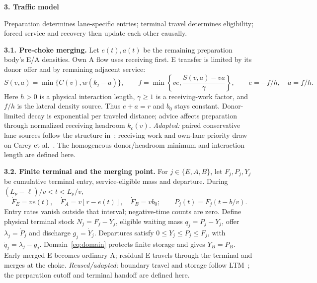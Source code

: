 \documentclass[10pt,a4paper]{article}
\newcommand{\head}[1]{\par\vspace{4pt}\noindent\textbf{#1}\par\nobreak\vspace{1pt}}
\begin{document}
\head{3. Traffic model}
Preparation determines lane-specific entries; terminal travel determines
eligibility; forced service and recovery then update each other causally.

\textbf{3.1. Pre-choke merging.}
Let $e(t),a(t)$ be the remaining preparation body's E/A densities.
Own A flow uses receiving first. E transfer is limited by its donor offer
and by remaining adjacent service:
\begin{equation}
 S(v,a)=\min\{C(v),w(k_j-a)\},\qquad
 f=\min\!\left\{ve,\frac{S(v,a)-va}{\gamma}\right\},\qquad
 \dot e=-f/h,\quad \dot a=f/h.
 \label{eq:prep}
\end{equation}
Here $h>0$ is a physical interaction length, $\gamma\geq1$ is a receiving-work
factor, and $f/h$ is the lateral density source. Thus $e+a=r$ and $b_0$
stays constant. Donor-limited decay is exponential per traveled distance;
advice affects preparation through normalized receiving headroom $k_c(v)$.
\emph{Adapted:} paired conservative lane sources follow the structure
in~\cite{subraveti}; receiving work and own-lane priority draw on
Carey et al.~\cite{carey}. The homogeneous donor/headroom minimum and
interaction length are defined here.

\textbf{3.2. Finite terminal and the merging point.}
For $j\in\{E,A,B\}$, let $F_j,P_j,Y_j$ be cumulative terminal entry,
service-eligible mass and departure. During
$(L_p-\ell)/v<t<L_p/v$,
\begin{equation}
 \dot F_E=ve(t),\quad \dot F_A=v[r-e(t)],\quad \dot F_B=vb_0;
 \qquad P_j(t)=F_j(t-b/v).
 \label{eq:arrivals}
\end{equation}
Entry rates vanish outside that interval; negative-time counts are zero.
Define physical terminal stock $N_j=F_j-Y_j$, eligible waiting mass
$q_j=P_j-Y_j$, offer $\lambda_j=\dot P_j$ and discharge $g_j=\dot Y_j$.
Departures satisfy $0\leq Y_j\leq P_j\leq F_j$, with
$\dot q_j=\lambda_j-g_j$. Domain~\eqref{eq:domain} protects finite storage
and gives $Y_B=P_B$. Early-merged E becomes ordinary A; residual E travels
through the terminal and merges at the choke.
\emph{Reused/adapted:} boundary travel and storage follow LTM~\cite{jin};
the preparation cutoff and terminal handoff are defined here.
\end{document}
